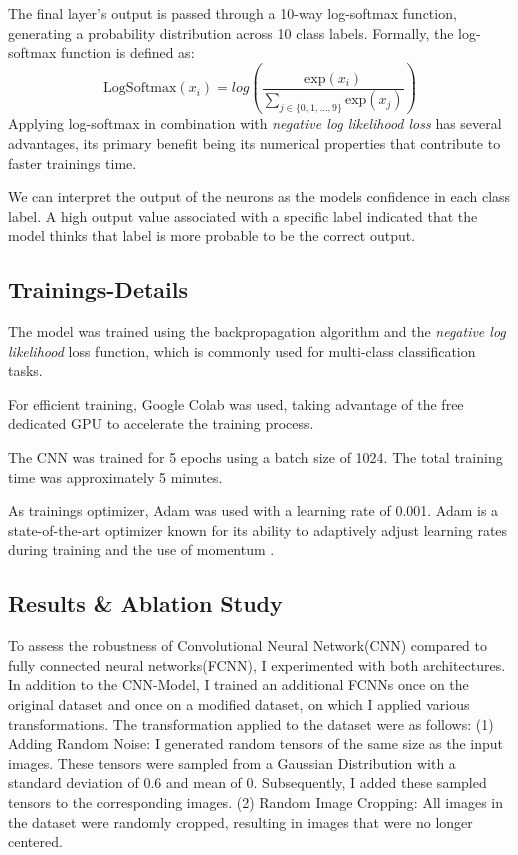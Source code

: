 The final layer's output is passed through a 10-way log-softmax function, generating a probability distribution across 10 class labels. Formally, the log-softmax function is defined as: 
$$
\text{LogSoftmax}(x_i) = log(\frac{\text{exp}(x_i)}{\sum_{j \in \{0, 1, ..., 9\}}\text{exp}(x_j)})
$$
Applying log-softmax in combination with \textit{negative log likelihood loss} has several advantages, its primary benefit being its numerical properties that contribute to faster trainings time.

We can interpret the output of the neurons as the models confidence in each class label.
A high output value associated with a specific label indicated that the model thinks that label is more probable to be the correct output.

\subsection{Trainings-Details}

The model was trained using the backpropagation algorithm and the \textit{negative log likelihood} loss function, which is commonly used for multi-class classification tasks.

For efficient training, Google Colab was used, taking advantage of the free dedicated GPU to  accelerate the training process.

The CNN was trained for 5 epochs using a batch size of 1024.
The total training time was approximately 5 minutes.

As trainings optimizer, Adam was used with a learning rate of 0.001. Adam is a state-of-the-art optimizer known for its ability to adaptively adjust learning rates during training and the use of momentum \citep{kingma2014adam}.

\subsection{Results \& Ablation Study} \label{resultsAbalation}

To assess the robustness of Convolutional Neural Network(CNN) compared to fully connected neural networks(FCNN), I experimented with both architectures.
In addition to the CNN-Model, I trained an additional FCNNs once on the original dataset and once on a modified dataset, on which I applied various transformations.
The transformation applied to the dataset were as follows:
(1) Adding Random Noise: I generated random tensors of the same size as the input images. These tensors were sampled from a Gaussian Distribution with a standard deviation of 0.6 and mean of 0. Subsequently, I added these sampled tensors to the corresponding images.
(2) Random Image Cropping: All images in the dataset were randomly cropped, resulting in images that were no longer centered.

